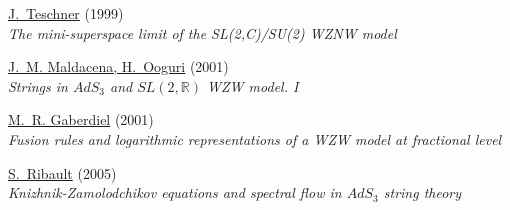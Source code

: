 \begin{thebibliography}{10}
\href{http://arxiv.org/abs/hep-th/9712258}{J.~Teschner} (1999)\\ {\em The
  mini-superspace limit of the {SL(2,C)/SU(2) WZNW} model\/}

\href{http://arxiv.org/abs/hep-th/0001053}{J.~M. Maldacena, H.~Ooguri} (2001)\\
  {\em Strings in {$AdS_3$ and $SL(2,\mathbb{R})$ WZW model. I}\/}

\href{http://arxiv.org/abs/hep-th/0105046}{M.~R. Gaberdiel} (2001)\\ {\em
  {Fusion rules and logarithmic representations of a WZW model at fractional
  level}\/}

\href{http://arxiv.org/abs/hep-th/0507114}{S.~Ribault} (2005)\\ {\em
  Knizhnik-Zamolodchikov equations and spectral flow in $AdS_3$ string
  theory\/}

\end{thebibliography}
